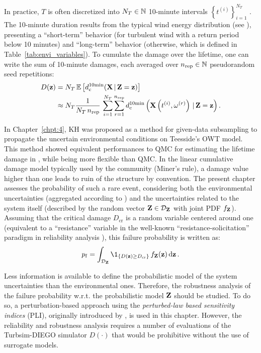 In practice, $T$ is often discretized into $N_T \in \mathbb{N}$ 10-minute intervals $\left\{t^{(i)}\right\}_{i=1}^{N_T}$ \citep[Appendix H]{iec_2019}. 
The 10-minute duration results from the typical wind energy distribution (see ), presenting a ``short-term'' behavior (for turbulent wind with a return period below 10 minutes) and ``long-term'' behavior (otherwise, which is defined in Table~\ref{tab:envi_variables}).
To cumulate the damage over the lifetime, one can write the sum of 10-minute damages, each averaged over $n_{\mathrm{rep}} \in \mathbb{N}$ pseudorandom seed repetitions: 
\begin{subequations}
    \begin{align}
        D({\bf z}) &= N_T \, \mathbb{E}\left[d_{\mathrm{c}}^{10\mathrm{min}}({\bf X}\,|\,{\bf Z}={\bf z})\right]\\
             & \approx N_T \frac{1}{N_T \, n_{\mathrm{rep}}} \, \sum_{i=1}^{N_T} \sum_{r=1}^{n_{\mathrm{rep}}} d_{\mathrm{c}}^{10\mathrm{min}}\left({\bf X}\left(t^{(i)}, \omega^{(r)}\right)\,|\,{\bf Z}={\bf z}\right).
             \label{eq:expected_damage}
    \end{align}
\end{subequations}

In Chapter~\ref{chpt:4}, KH was proposed as a method for given-data subsampling to propagate the uncertain environmental conditions on Teesside's OWT model. 
This method showed equivalent performances to QMC for estimating the lifetime damage in , while being more flexible than QMC. 
In the linear cumulative damage model typically used by the community (Miner's rule), a damage value higher than one leads to ruin of the structure by convention. 
The present chapter assesses the probability of such a rare event, considering both the environmental uncertainties (aggregated according to ) and the uncertainties related to the system itself (described by the random vector ${\bf Z} \in \mathcal{D}_{\bf Z}$ with joint PDF $f_{\bf Z}$). 
Assuming that the critical damage $D_{\mathrm{cr}}$ is a random variable centered around one (equivalent to a ``resistance'' variable in the well-known ``resistance-solicitation'' paradigm in reliability analysis \citealp{lemaire_2009}), this failure probability is written as:
\begin{equation}
    \pf = \int_{\iD_\bZ} \1_{\{D(\bz) \geq D_{\mathrm{cr}}\}} \, f_\bZ(\bz) \, \dd \bz \,.
    \label{eq:owt_pf}
\end{equation}

Less information is available to define the probabilistic model of the system uncertainties than the environmental ones. 
Therefore, the robustness analysis of the failure probability w.r.t. the probabilistic model ${\bf Z}$ should be studied. 
To do so, a perturbation-based approach using the \textit{perturbed-law based sensitivity indices} (PLI), originally introduced by \citep{lemaitre_2015_PLI}, is used in this chapter.   
However, the reliability and robustness analysis requires a number of evaluations of the Turbsim-DIEGO simulator $D(\cdot)$ that would be prohibitive without the use of surrogate models. 

